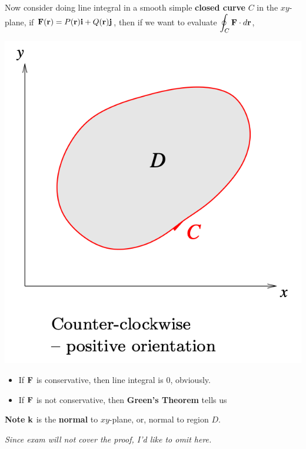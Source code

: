 \documentclass[11pt, a4paper]{MATH2023}
\newcommand{\ii}{{\bf i}}
\newcommand{\jj}{{\bf j}}
\newcommand{\kk}{{\bf k}}
\newcommand{\rr}{{\bf r}}
\newcommand{\FF}{{\bf F}}
\begin{document}
\begin{spacing}{1.3}
    Now consider doing line integral in a smooth simple {\bf closed curve} $C$ in the $xy$-plane,
    if $\FF(\rr)=P(\rr)\ii+Q(\rr)\jj$, then if we want to evaluate $\disp \oint_C\FF\cdot d\rr$,
    \begin{center}
        \includegraphics[scale=0.43]{images/Ch16-green-closed-path.png}
    \end{center}
    \begin{itemize}
        \item If $\FF$ is conservative, then line integral is 0, obviously.
        \item If $\FF$ is not conservative, then {\bf Green's Theorem} tells us 
        \begin{center}
            \boxed{$$\disp \oint_C \FF\cdot d\rr=\iint_D (\nabla \times \FF)\cdot \kk\ dA$$}
        \end{center}
    \end{itemize}
    {\bf Note} $\kk$ is the {\bf normal} to $xy$-plane, or, normal to region $D$.

    \vspace{0.3in}
    {\it Since exam will not cover the proof, I'd like to omit here.}

    
    

\end{spacing}
\end{document}
